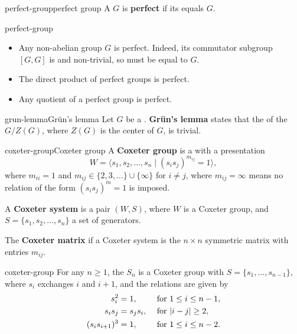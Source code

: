 \begin{topic}{perfect-group}{perfect group}
    A  $G$ is \textbf{perfect} if its  equals $G$.
\end{topic}

\begin{example}{perfect-group}
    \begin{itemize}
        \item Any non-abelian  group $G$ is perfect. Indeed, its commutator subgroup $[G, G]$ is  and non-trivial, so must be equal to $G$.
        \item The direct product of perfect groups is perfect.
        \item Any quotient of a perfect group is perfect.
    \end{itemize}
\end{example}

\begin{topic}{grun-lemma}{Grün's lemma}
    Let $G$ be a  . \textbf{Grün's lemma} states that the  of the  $G / Z(G)$, where $Z(G)$ is the center of $G$, is trivial.
\end{topic}

\begin{topic}{coxeter-group}{Coxeter group}
    A \textbf{Coxeter group} is a  with a presentation
    \[ W = \langle s_1, s_2, \ldots, s_n \mid (s_i s_j)^{m_{ij}} = 1 \rangle , \]
    where $m_{ii} = 1$ and $m_{ij} \in \{ 2, 3, \ldots \} \cup \{ \infty \}$ for $i \ne j$, where $m_{ij} = \infty$ means no relation of the form $(s_i s_j)^m = 1$ is imposed.
    
    A \textbf{Coxeter system} is a pair $(W, S)$, where $W$ is a Coxeter group, and $S = \{ s_1, s_2, \ldots, s_n \}$ a set of generators.
    
    The \textbf{Coxeter matrix} if a Coxeter system is the $n \times n$ symmetric matrix with entries $m_{ij}$.
\end{topic}

\begin{example}{coxeter-group}
    For any $n \ge 1$, the  $S_n$ is a Coxeter group with $S = \{ s_1, \ldots, s_{n - 1} \}$, where $s_i$ exchanges $i$ and $i + 1$, and the relations are given by
    \[ \begin{aligned}
        s_i^2 &= 1, && \textup{ for } 1 \le i \le n - 1, \\
        s_i s_j &= s_j s_i, && \textup{ for } |i - j| \ge 2 , \\
        (s_i s_{i + 1})^3 &= 1, && \textup{ for } 1 \le i \le n - 2 .
    \end{aligned} \]
\end{example}

